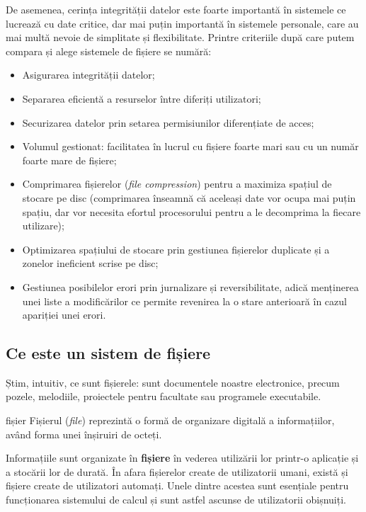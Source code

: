 De asemenea, cerința integrității datelor este foarte importantă în sistemele
ce lucrează cu date critice, dar mai puțin importantă în sistemele personale,
care au mai multă nevoie de simplitate și flexibilitate. Printre criteriile după
care putem compara și alege sistemele de fișiere se numără:

\begin{itemize}
	\item Asigurarea integrității datelor;
	\item Separarea eficientă a resurselor între diferiți utilizatori;
	\item Securizarea datelor prin setarea permisiunilor diferențiate de acces;
	\item Volumul gestionat: facilitatea în lucrul cu fișiere foarte mari
		sau cu un număr foarte mare de fișiere;
	\item Comprimarea fișierelor (\textit{file compression}) pentru a
		maximiza spațiul de stocare pe disc (comprimarea înseamnă că
		aceleași date vor ocupa mai puțin spațiu, dar vor necesita
		efortul procesorului pentru a le decomprima la fiecare
		utilizare);
	\item Optimizarea spațiului de stocare prin gestiunea fișierelor
		duplicate și a zonelor ineficient scrise pe disc;
	\item Gestiunea posibilelor erori prin jurnalizare și reversibilitate,
		adică menținerea unei liste a modificărilor ce permite revenirea
		la o stare anterioară în cazul apariției unei erori.
\end{itemize}

\subsection{Ce este un sistem de fișiere}
\label{sec:file-system-baza-def}

Știm, intuitiv, ce sunt fișierele: sunt documentele noastre electronice,
precum pozele, melodiile, proiectele pentru facultate sau programele
executabile.

\begin{definition}{fișier}
Fișierul (\textit{file}) reprezintă o formă de organizare digitală a informațiilor, având forma unei înșiruiri de octeți.
\end{definition}

Informațiile sunt organizate în \textbf{fișiere} în vederea
utilizării lor printr-o aplicație și a stocării lor de durată.
În afara fișierelor create de utilizatorii umani, există și
fișiere create de utilizatori automați. Unele dintre acestea
sunt esențiale pentru funcționarea sistemului de calcul și sunt
astfel ascunse de
utilizatorii obișnuiți.

